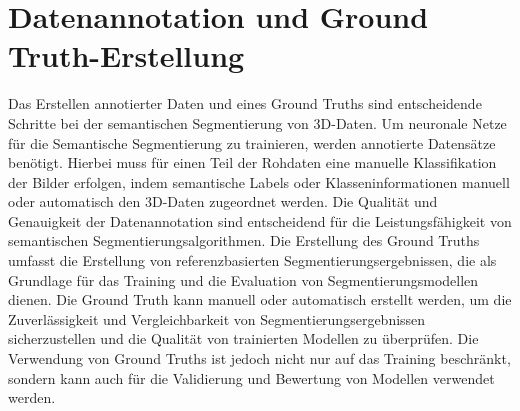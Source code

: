 \section{Datenannotation und Ground Truth-Erstellung}

Das Erstellen annotierter Daten und eines Ground Truths sind entscheidende
Schritte bei der semantischen Segmentierung von 3D-Daten. Um neuronale Netze
für die Semantische Segmentierung zu trainieren, werden annotierte Datensätze
benötigt. Hierbei muss für einen Teil der Rohdaten eine manuelle Klassifikation
der Bilder erfolgen, indem semantische Labels oder Klasseninformationen manuell
oder automatisch den 3D-Daten zugeordnet werden. Die Qualität und Genauigkeit
der Datenannotation sind entscheidend für die Leistungsfähigkeit von
semantischen Segmentierungsalgorithmen. Die Erstellung des Ground Truths
umfasst die Erstellung von referenzbasierten Segmentierungsergebnissen, die als
Grundlage für das Training und die Evaluation von Segmentierungsmodellen
dienen. Die Ground Truth kann manuell oder automatisch erstellt werden, um die
Zuverlässigkeit und Vergleichbarkeit von Segmentierungsergebnissen
sicherzustellen und die Qualität von trainierten Modellen zu überprüfen. Die
Verwendung von Ground Truths ist jedoch nicht nur auf das Training beschränkt,
sondern kann auch für die Validierung und Bewertung von Modellen verwendet
werden.